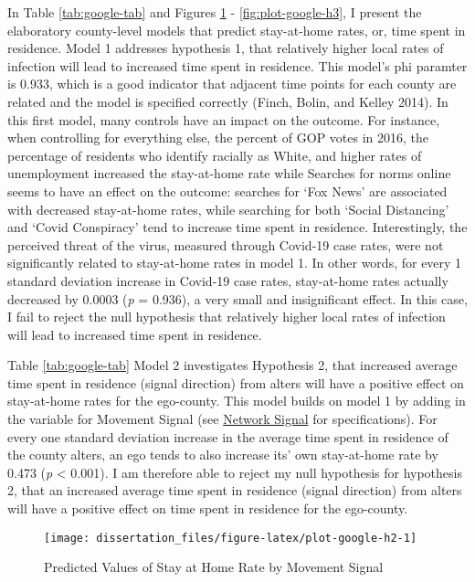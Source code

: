 In Table \ref{tab:google-tab} and Figures \ref{fig:plot-google-h2} -
\ref{fig:plot-google-h3}, I present the elaboratory county-level models that
predict stay-at-home rates, or, time spent in residence. Model 1 addresses
hypothesis 1, that relatively higher local rates of infection will lead to
increased time spent in residence. This model's phi paramter is 0.933, which is
a good indicator that adjacent time points for each county are related and the
model is specified correctly (Finch, Bolin, and Kelley 2014). In this first model, many controls
have an impact on the outcome. For instance, when controlling for everything
else, the percent of GOP votes in 2016, the percentage of residents who identify
racially as White, and higher rates of unemployment increased the stay-at-home
rate while Searches for norms online seems to
have an effect on the outcome: searches for `Fox News' are associated with
decreased stay-at-home rates, while searching for both `Social Distancing' and
`Covid Conspiracy' tend to increase time spent in residence. Interestingly, the
perceived threat of the virus, measured through Covid-19 case rates, were not
significantly related to stay-at-home rates in model 1. In other words, for
every 1 standard deviation increase in Covid-19 case rates, stay-at-home rates
actually decreased by
0.0003 (\emph{p} = 0.936),
a very small and insignificant effect. In this case, I fail to reject the null
hypothesis that relatively higher local rates of infection will lead to
increased time spent in residence.

Table \ref{tab:google-tab} Model 2 investigates Hypothesis 2, that increased
average time spent in residence (signal direction) from alters will have a
positive effect on stay-at-home rates for the ego-county. This model builds on
model 1 by adding in the variable for Movement Signal (see \protect\hyperlink{network-signal}{Network
Signal} for specifications). For every one standard deviation
increase in the average time spent in residence of the county alters, an ego tends to also increase its' own stay-at-home rate by
0.473
(\emph{p} \textless{} 0.001). I am therefore able to reject my null hypothesis for hypothesis
2, that an increased average time spent in residence (signal direction) from
alters will have a positive effect on time spent in residence for the
ego-county.

\begin{figure}

{\centering \texttt{[image: dissertation\_files/figure-latex/plot-google-h2-1]} 

}

\caption{Predicted Values of Stay at Home Rate by Movement Signal}\label{fig:plot-google-h2}
\end{figure}

